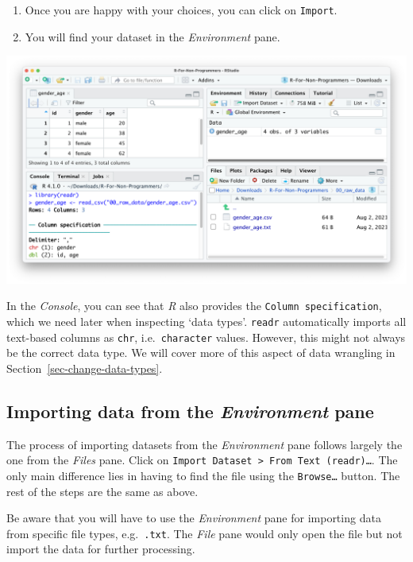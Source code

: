 \documentclass[
  letterpaper,
]{krantz}
\begin{document}
\begin{enumerate}
\def\labelenumi{\arabic{enumi}.}
\setcounter{enumi}{4}
\item
  Once you are happy with your choices, you can click on
  \texttt{Import}.
\item
  You will find your dataset in the \emph{Environment} pane.
\end{enumerate}

\includegraphics{images/chapter_07_img/01_files_pane_import/04_files_pane_import.png}

In the \emph{Console}, you can see that \emph{R} also provides the
\texttt{Column\ specification}, which we need later when inspecting
`data types'. \texttt{readr} automatically imports all text-based
columns as \texttt{chr}, i.e.~\texttt{character} values. However, this
might not always be the correct data type. We will cover more of this
aspect of data wrangling in Section~\ref{sec-change-data-types}.

\subsection{\texorpdfstring{Importing data from the \emph{Environment}
pane}{Importing data from the Environment pane}}\label{sec-importing-data-from-the-environment-pane}

The process of importing datasets from the \emph{Environment} pane
follows largely the one from the \emph{Files} pane. Click on
\texttt{Import\ Dataset\ \textgreater{}\ From\ Text\ (readr)…}. The only
main difference lies in having to find the file using the
\texttt{Browse…} button. The rest of the steps are the same as above.

Be aware that you will have to use the \emph{Environment} pane for
importing data from specific file types, e.g.~\texttt{.txt}. The
\emph{File} pane would only open the file but not import the data for
further processing.
\end{document}
